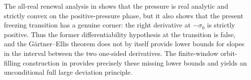 The all-real renewal analysis in  shows that the
pressure is real analytic and strictly convex on the positive-pressure phase,
but it also shows that the present freezing transition has a genuine corner:
the right derivative at \(-\sigma_0\) is strictly positive.  Thus the former
differentiability hypothesis at the transition is false, and the
G\"artner--Ellis theorem does not by itself provide lower bounds for slopes in
the interval between the two one-sided derivatives.  The finite-window
orbit-filling construction in  provides precisely
these missing lower bounds and yields an unconditional full large deviation
principle.
